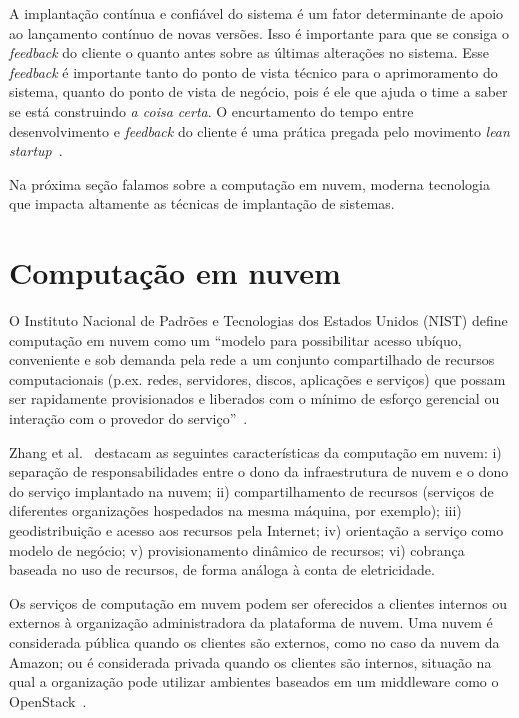 A implantação contínua e confiável do sistema é um fator determinante de apoio ao lançamento
contínuo de novas versões. Isso é importante para que se consiga o \emph{feedback} do cliente
o quanto antes sobre as últimas alterações no sistema.
Esse \emph{feedback} é importante tanto do ponto de vista técnico para o aprimoramento do sistema,
quanto do ponto de vista de negócio, pois é ele que ajuda o time a saber se está construindo
\emph{a coisa certa}.
O encurtamento do tempo entre desenvolvimento e \emph{feedback} do cliente
é uma prática pregada pelo movimento \emph{lean startup}~\cite{Ries2011Lean}.

Na próxima seção falamos sobre a computação em nuvem,
moderna tecnologia que impacta altamente as técnicas de implantação de sistemas.


\section{Computação em nuvem}
\label{sec:cloud}

O Instituto Nacional de Padrões e Tecnologias dos Estados Unidos (NIST) define computação em nuvem como um ``modelo para possibilitar acesso ubíquo, conveniente e sob demanda pela rede a um conjunto compartilhado de recursos computacionais (p.ex. redes, servidores, discos, aplicações e serviços) que possam ser rapidamente provisionados e liberados com o mínimo de esforço gerencial ou interação com o provedor do serviço''~\cite{Nist2011Cloud}. 

Zhang et al.~\cite{Zhang2010Cloud} destacam as seguintes características da computação em nuvem: i) separação de responsabilidades entre o dono da infraestrutura de nuvem e o dono do serviço implantado na nuvem; ii) compartilhamento de recursos (serviços de diferentes organizações hospedados na mesma máquina, por exemplo); iii) geodistribuição e acesso aos recursos pela Internet; iv) orientação a serviço como modelo de negócio; v) provisionamento dinâmico de recursos; vi) cobrança baseada no uso de recursos, de forma análoga à conta de eletricidade.

Os serviços de computação em nuvem podem ser oferecidos a clientes internos ou externos à organização administradora da plataforma de nuvem. Uma nuvem é considerada pública quando os clientes são externos, como no caso da nuvem da Amazon; ou é considerada privada quando os clientes são internos,  situação na qual a organização pode utilizar ambientes baseados em um middleware como o OpenStack~\cite{Zhang2010Cloud}.

